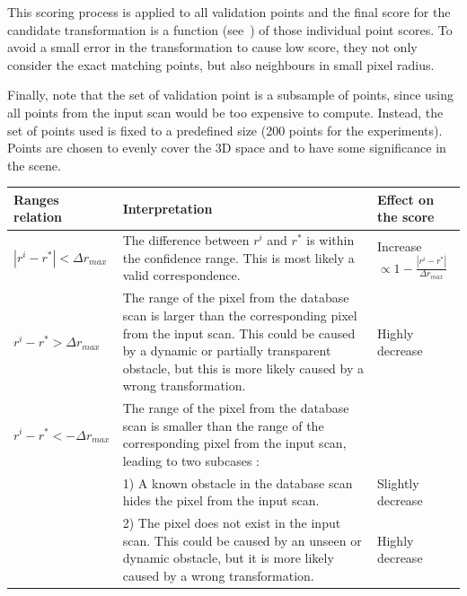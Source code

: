 This scoring process is applied to all validation points and the final score for the candidate transformation is a function (see~\citep[Equation~1]{Steder2011b}) of those individual point scores. To avoid a small error in the transformation to cause low score, they not only consider the exact matching points, but also neighbours in small pixel radius.

Finally, note that the set of validation point is a subsample of points, since using all points from the input scan would be too expensive to compute. Instead, the set of points used is fixed to a predefined size (200 points for the experiments). Points are chosen to evenly cover the 3D space and to have some significance in the scene. 

\begin{table}
    \centering
    \begin{tabular}{@{}p{}p{}p{}@{}}
        \toprule %
        \textbf{Ranges relation}         & \textbf{Interpretation}                                                                                                    & \textbf{Effect on the score} \\
        \hline
        $|r^i - r^*| < \Delta r_{max}$   & The difference between $r^i$ and $r^*$ is within the confidence range. This is most likely a valid correspondence.      & Increase $\propto 1-\frac{|r^i-r^*|}{\Delta r_{max}}$ \\
        $r^i - r^* > \Delta r_{max}$     & The range of the pixel from the database scan is larger than the corresponding pixel from the input scan. This could be caused by a dynamic or partially transparent obstacle, but this is more likely caused by a wrong transformation. & Highly decrease \\
        $r^i - r^* < -\Delta r_{max}$    & The range of the pixel from the database scan is smaller than the range of the corresponding pixel from the input scan, leading to two subcases : & \\
                                         & 1) A known obstacle in the database scan hides the pixel from the input scan.                                           & Slightly decrease \\
                                         & 2) The pixel does not exist in the input scan. This could be caused by an unseen or dynamic obstacle, but it is more likely caused by a wrong transformation.       & Highly decrease \\

\end{tabular}
\end{table}
